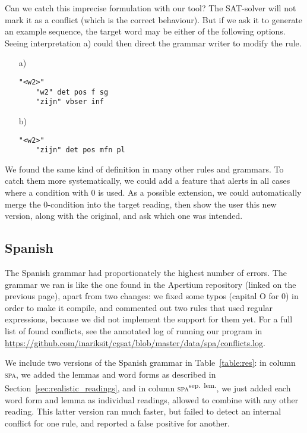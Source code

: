 {{Can we catch this imprecise formulation with our tool? The SAT-solver will not mark it as a conflict (which is the correct behaviour). But if we ask it to generate an example sequence, the target word may be either of the following options. Seeing interpretation a) could then direct the grammar writer to modify the rule.

\begin{itemize}
\item[a)] \begin{verbatim}
"<w2>"
    "w2" det pos f sg
    "zijn" vbser inf
\end{verbatim}

\item[b)] \begin{verbatim}
"<w2>"
    "zijn" det pos mfn pl
\end{verbatim}
\end{itemize}


We found the same kind of definition in many other rules and grammars.
To catch them more systematically, we could add a feature that alerts in all cases where a condition with 0 is used. As a possible extension, we could automatically merge the 0-condition into the target reading, then show the user this new version, along with the original, and ask which one was intended.


\subsection{Spanish} The Spanish grammar had proportionately the
highest number of errors. The grammar we ran is like the one
found in the Apertium repository (linked on the previous page), 
apart from two changes: we fixed some typos (capital O for 0) in order to make it compile, and
commented out two rules that used regular expressions, because we did not implement the support for them yet.
For a full list of found conflicts, see the annotated log of running our program in \url{
https://github.com/inariksit/cgsat/blob/master/data/spa/conflicts.log}. 


We include two versions of the Spanish grammar in Table~\ref{table:res}: in column \textsc{spa}, we added the lemmas and word forms as described in Section~\ref{sec:realistic_readings}, and in column \textsc{spa}\textsuperscript{sep.~lem.}, we just added each word form and lemma as individual readings, allowed to combine with any other reading. 
This latter version ran much faster, but failed to detect an internal conflict for one rule, and reported a false positive for another. 

}}
